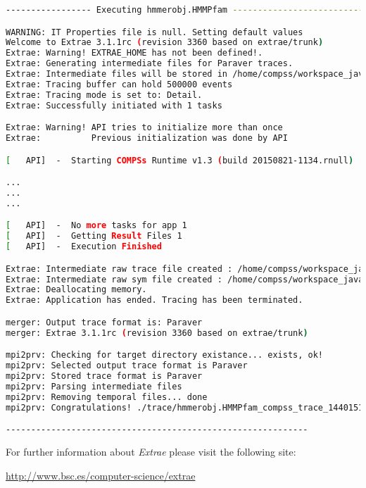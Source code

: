 \begin{lstlisting}[language=bash]
----------------- Executing hmmerobj.HMMPfam --------------------------

WARNING: IT Properties file is null. Setting default values
Welcome to Extrae 3.1.1rc (revision 3360 based on extrae/trunk)
Extrae: Warning! EXTRAE_HOME has not been defined!.
Extrae: Generating intermediate files for Paraver traces.
Extrae: Intermediate files will be stored in /home/compss/workspace_java/hmmerobj/jar
Extrae: Tracing buffer can hold 500000 events
Extrae: Tracing mode is set to: Detail.
Extrae: Successfully initiated with 1 tasks

Extrae: Warning! API tries to initialize more than once
Extrae:          Previous initialization was done by API

[   API]  -  Starting COMPSs Runtime v1.3 (build 20150821-1134.rnull)

...
...
...

[   API]  -  No more tasks for app 1
[   API]  -  Getting Result Files 1
[   API]  -  Execution Finished

Extrae: Intermediate raw trace file created : /home/compss/workspace_java/hmmerobj/jar/set-0/TRACE@bsc.0000031637000000000000.mpit
Extrae: Intermediate raw sym file created : /home/compss/workspace_java/hmmerobj/jar/set-0/TRACE@bsc.0000031637000000000000.sym
Extrae: Deallocating memory.
Extrae: Application has ended. Tracing has been terminated.

merger: Output trace format is: Paraver
merger: Extrae 3.1.1rc (revision 3360 based on extrae/trunk)

mpi2prv: Checking for target directory existance... exists, ok!
mpi2prv: Selected output trace format is Paraver
mpi2prv: Stored trace format is Paraver
mpi2prv: Parsing intermediate files
mpi2prv: Removing temporal files... done
mpi2prv: Congratulations! ./trace/hmmerobj.HMMPfam_compss_trace_1440151114.prv has been generated.

------------------------------------------------------------
\end{lstlisting}

For further information about \textit{Extrae} please visit the following site: 
\begin{center}
\url{http://www.bsc.es/computer-science/extrae} 
\end{center}